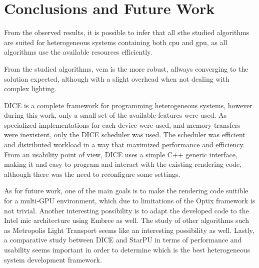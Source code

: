 \chapter{Conclusions and Future Work}








From the observed results, it is possible to infer that all sthe studied algorithms are suited for heterogeneous systems containing both \gls{cpu} and \gls{gpu}, as all algorithms use the available resources efficiently.

From the studied algorithms, \gls{vcm} is the more robust, allways converging to the solution expected, although with a slight overhead when not dealing with complex lighting.

DICE is a complete framework for programming heterogeneous systems, however during this work, only a small set of the available features were used. As specialized implementations for each device were used, and memory transfers were inexistent, only the DICE scheduler was used. The scheduler was efficient and distributed workload in a way that maximized performance and efficiency. From an usability point of view, DICE uses a simple C++ generic interface, making it and easy to program and interact with the existing rendering code, although there was the need to reconfigure some settings.

As for future work, one of the main goals is to make the rendering code suitible for a multi-GPU environment, which due to limitations of the Optix framework is not trivial. Another interesting possibility is to adapt the developed code to the Intel \gls{mic} architecture using Embree as well. The study of other algorithms such as Metropolis Light Transport seems like an interesting possibility as well. Lastly, a comparative study between DICE and StarPU in terms of performance and usability seems important in order to determine which is the best heterogeneous system development framework.